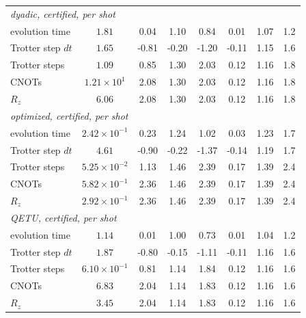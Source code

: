 \documentclass[10pt]{article}
\begin{document}
\begin{table}[h]
\begin{tabular}{lccccccc}
\multicolumn{8}{l}{\emph{dyadic, certified, per shot}} \\
\quad evolution time & $1.81$ & 0.04 & 1.10 & 0.84 & 0.01 & 1.07 & 1.2 \\
\quad Trotter step $dt$ & $1.65$ & -0.81 & -0.20 & -1.20 & -0.11 & 1.15 & 1.6 \\
\quad Trotter steps & $1.09$ & 0.85 & 1.30 & 2.03 & 0.12 & 1.16 & 1.8 \\
\quad CNOTs & $1.21\times10^{1}$ & 2.08 & 1.30 & 2.03 & 0.12 & 1.16 & 1.8 \\
\quad $R_z$ & $6.06$ & 2.08 & 1.30 & 2.03 & 0.12 & 1.16 & 1.8 \\
\multicolumn{8}{l}{\emph{optimized, certified, per shot}} \\
\quad evolution time & $2.42\times10^{-1}$ & 0.23 & 1.24 & 1.02 & 0.03 & 1.23 & 1.7 \\
\quad Trotter step $dt$ & $4.61$ & -0.90 & -0.22 & -1.37 & -0.14 & 1.19 & 1.7 \\
\quad Trotter steps & $5.25\times10^{-2}$ & 1.13 & 1.46 & 2.39 & 0.17 & 1.39 & 2.4 \\
\quad CNOTs & $5.82\times10^{-1}$ & 2.36 & 1.46 & 2.39 & 0.17 & 1.39 & 2.4 \\
\quad $R_z$ & $2.92\times10^{-1}$ & 2.36 & 1.46 & 2.39 & 0.17 & 1.39 & 2.4 \\
\multicolumn{8}{l}{\emph{QETU, certified, per shot}} \\
\quad evolution time & $1.14$ & 0.01 & 1.00 & 0.73 & 0.01 & 1.04 & 1.2 \\
\quad Trotter step $dt$ & $1.87$ & -0.80 & -0.15 & -1.11 & -0.11 & 1.16 & 1.6 \\
\quad Trotter steps & $6.10\times10^{-1}$ & 0.81 & 1.14 & 1.84 & 0.12 & 1.16 & 1.6 \\
\quad CNOTs & $6.83$ & 2.04 & 1.14 & 1.83 & 0.12 & 1.16 & 1.6 \\
\quad $R_z$ & $3.45$ & 2.04 & 1.14 & 1.83 & 0.12 & 1.16 & 1.6 \\
\bottomrule\end{tabular}
\end{table}
\end{document}
